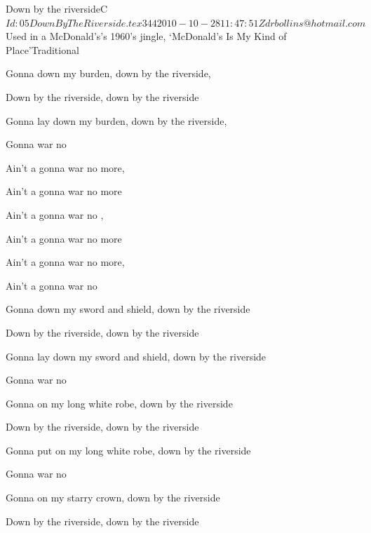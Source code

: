 \begin{SBSong}{Down by the riverside}{C}
    {$Id: 05DownByTheRiverside.tex 344 2010-10-28 11:47:51Z drbollins@hotmail.com $}
    {Used in a McDonald's's 1960's jingle, `McDonald's Is My Kind of Place'}{Traditional}
  \begin{SBVerse}
    Gonna  down my burden, down by the riverside,
    
    Down by the riverside, down by the riverside

    Gonna lay down my burden, down by the riverside,

    Gonna  war no 
  \end{SBVerse}
  \begin{SBChorus}
    Ain't a gonna  war no more, 

    Ain't a gonna  war no more

    Ain't a gonna  war no , 

    Ain't a gonna  war no more

    Ain't a gonna  war no more, 

    Ain't a gonna  war no   
  \end{SBChorus}
  \begin{SBVerse}
    Gonna  down my sword and shield,  down by the riverside

    Down by the riverside, down by the riverside

    Gonna lay down my sword and shield, down by the riverside

    Gonna  war no 
  \end{SBVerse}
  \begin{SBVerse}
    Gonna  on my long white robe, down by the riverside

    Down by the riverside, down by the riverside

    Gonna put on my long white robe, down by the riverside

    Gonna  war no 
  \end{SBVerse}
  \begin{SBVerse}
    Gonna  on my starry crown, down by the riverside

    Down by the riverside, down by the riverside
    

\end{SBVerse}
\end{SBSong}
